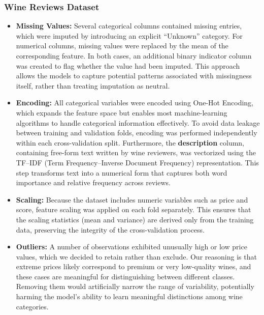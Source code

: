 \documentclass[12pt,a4paper]{article}
\begin{document}
\subsubsection{Wine Reviews Dataset}
\begin{itemize}
\item \textbf{Missing Values:} Several categorical columns contained missing entries, which were imputed by introducing an explicit “Unknown” category. For numerical columns, missing values were replaced by the mean of the corresponding feature. In both cases, an additional binary indicator column was created to flag whether the value had been imputed. This approach allows the models to capture potential patterns associated with missingness itself, rather than treating imputation as neutral.
\item \textbf{Encoding:} All categorical variables were encoded using One-Hot Encoding, which expands the feature space but enables most machine-learning algorithms to handle categorical information effectively. To avoid data leakage between training and validation folds, encoding was performed independently within each cross-validation split. Furthermore, the \textbf{description} column, containing free-form text written by wine reviewers, was vectorized using the TF–IDF (Term Frequency–Inverse Document Frequency) representation. This step transforms text into a numerical form that captures both word importance and relative frequency across reviews.
\item \textbf{Scaling:} Because the dataset includes numeric variables such as price and score, feature scaling was applied on each fold separately. This ensures that the scaling statistics (mean and variance) are derived only from the training data, preserving the integrity of the cross-validation process.
\item \textbf{Outliers:} A number of observations exhibited unusually high or low price values, which we decided to retain rather than exclude. Our reasoning is that extreme prices likely correspond to premium or very low-quality wines, and these cases are meaningful for distinguishing between different classes. Removing them would artificially narrow the range of variability, potentially harming the model's ability to learn meaningful distinctions among wine categories.
\end{itemize}

\vspace{0.5cm}
\end{document}
